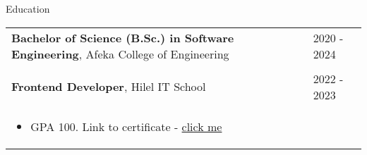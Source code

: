 \documentclass{resume}
\begin{document}
\vspace{5pt}
\begin{rSection}{Education}

\begin{tabular}{@{}p{}p{}}
  {\bf Bachelor of Science (B.Sc.) in Software Engineering}, Afeka College of Engineering & \hfill 2020 - 2024\hspace*{1em} \\
  & \hfill \\
  {\bf Frontend Developer}, Hilel IT School & \hfill 2022 - 2023\hspace*{1em} \\
  \begin{itemize}
      \item GPA 100. Link to certificate - \href{https://certificate.ithillel.ua/view/81706976}{click me} 
  \end{itemize}
\end{tabular}

\end{rSection}


\end{document}
